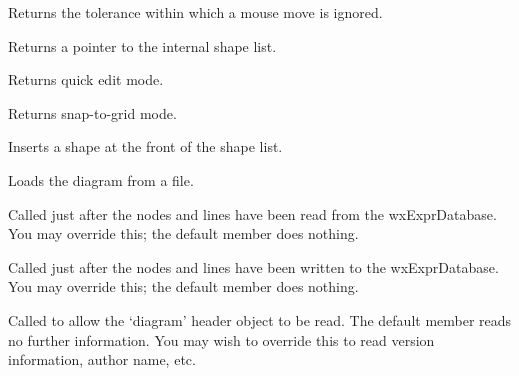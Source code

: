 
Returns the tolerance within which a mouse move is ignored.



Returns a pointer to the internal shape list.



Returns quick edit mode.



Returns snap-to-grid mode.



Inserts a shape at the front of the shape list.



Loads the diagram from a file.



Called just after the nodes and lines have been read from the wxExprDatabase. You may override this;
the default member does nothing.



Called just after the nodes and lines have been written to the wxExprDatabase. You may override this;
the default member does nothing.



Called to allow the `diagram' header object to be read. The default member reads no further information.
You may wish to override this to read version information, author name, etc.


